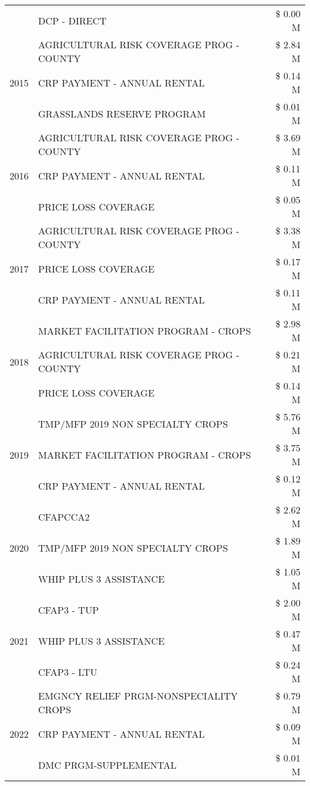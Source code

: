 \begin{tabular}{llr}
 & DCP - DIRECT & \$ 0.00 M \\
\cline{1-3}
\multirow[t]{3}{*}{2015} & AGRICULTURAL RISK COVERAGE PROG - COUNTY & \$ 2.84 M \\
 & CRP PAYMENT - ANNUAL RENTAL & \$ 0.14 M \\
 & GRASSLANDS RESERVE PROGRAM & \$ 0.01 M \\
\cline{1-3}
\multirow[t]{3}{*}{2016} & AGRICULTURAL RISK COVERAGE PROG - COUNTY & \$ 3.69 M \\
 & CRP PAYMENT - ANNUAL RENTAL & \$ 0.11 M \\
 & PRICE LOSS COVERAGE & \$ 0.05 M \\
\cline{1-3}
\multirow[t]{3}{*}{2017} & AGRICULTURAL RISK COVERAGE PROG - COUNTY & \$ 3.38 M \\
 & PRICE LOSS COVERAGE & \$ 0.17 M \\
 & CRP PAYMENT - ANNUAL RENTAL & \$ 0.11 M \\
\cline{1-3}
\multirow[t]{3}{*}{2018} & MARKET FACILITATION PROGRAM - CROPS & \$ 2.98 M \\
 & AGRICULTURAL RISK COVERAGE PROG - COUNTY & \$ 0.21 M \\
 & PRICE LOSS COVERAGE & \$ 0.14 M \\
\cline{1-3}
\multirow[t]{3}{*}{2019} & TMP/MFP 2019 NON SPECIALTY CROPS & \$ 5.76 M \\
 & MARKET FACILITATION PROGRAM - CROPS & \$ 3.75 M \\
 & CRP PAYMENT - ANNUAL RENTAL & \$ 0.12 M \\
\cline{1-3}
\multirow[t]{3}{*}{2020} & CFAPCCA2 & \$ 2.62 M \\
 & TMP/MFP 2019 NON SPECIALTY CROPS & \$ 1.89 M \\
 & WHIP PLUS 3 ASSISTANCE & \$ 1.05 M \\
\cline{1-3}
\multirow[t]{3}{*}{2021} & CFAP3 - TUP & \$ 2.00 M \\
 & WHIP PLUS 3 ASSISTANCE & \$ 0.47 M \\
 & CFAP3 - LTU & \$ 0.24 M \\
\cline{1-3}
\multirow[t]{3}{*}{2022} & EMGNCY RELIEF PRGM-NONSPECIALITY CROPS & \$ 0.79 M \\
 & CRP PAYMENT - ANNUAL RENTAL & \$ 0.09 M \\
 & DMC PRGM-SUPPLEMENTAL & \$ 0.01 M \\
\cline{1-3}
\bottomrule
\end{tabular}

